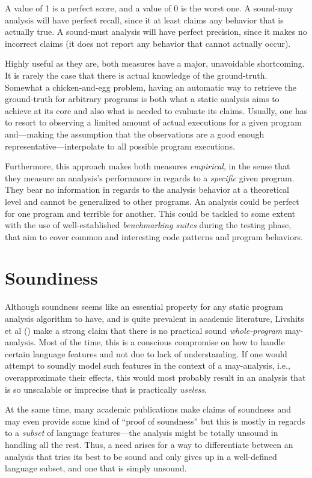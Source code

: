 A value of 1 is a perfect score, and a value of 0 is the worst one. A sound-may analysis will have perfect recall, since it at least claims any behavior that is actually true. A sound-must analysis will have perfect precision, since it makes no incorrect claims (it does not report any behavior that cannot actually occur).

Highly useful as they are, both measures have a major, unavoidable shortcoming. It is rarely the case that there is actual knowledge of the ground-truth. Somewhat a chicken-and-egg problem, having an automatic way to retrieve the ground-truth for arbitrary programs is both what a static analysis aims to achieve at its core and also what is needed to evaluate its claims. Usually, one has to resort to observing a limited amount of actual executions for a given program and---making the assumption that the observations are a good enough representative---interpolate to all possible program executions.

Furthermore, this approach makes both measures \emph{empirical}, in the sense that they measure an analysis's performance in regards to a \emph{specific} given program. They bear no information in regards to the analysis behavior at a theoretical level and cannot be generalized to other programs. An analysis could be perfect for one program and terrible for another. This could be tackled to some extent with the use of well-established \emph{benchmarking suites} during the testing phase, that aim to cover common and interesting code patterns and program behaviors.


\section{Soundiness}

Although soundness seems like an essential property for any static program analysis algorithm to have, and is quite prevalent in academic literature, Livshits et al (\todo{}) make a strong claim that there is no practical sound \emph{whole-program} may-analysis. Most of the time, this is a conscious compromise on how to handle certain language features and not due to lack of understanding. If one would attempt to soundly model such features in the context of a may-analysis, i.e., overapproximate their effects, this would most probably result in an analysis that is so unscalable or imprecise that is practically \emph{useless}.

At the same time, many academic publications make claims of soundness and may even provide some kind of ``proof of soundness'' but this is mostly in regards to a \emph{subset} of language features---the analysis might be totally unsound in handling all the rest. Thus, a need arises for a way to differentiate between an analysis that tries its best to be sound and only gives up in a well-defined language subset, and one that is simply unsound.

